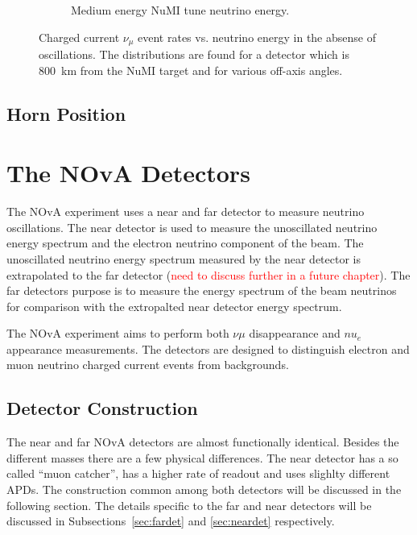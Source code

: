 \begin{figure}
\begin{subfigure}[b]{0.45\textwidth}
    \caption{Medium energy NuMI tune neutrino energy.}
    \label{fig:NuESpectra_MEAndLE_b}
  \end{subfigure}
  \caption{Charged current $\nu_{\mu}$ event rates vs. neutrino
    energy in the absense of oscillations. The distributions are found
  for a detector which is 800~km from the NuMI target and for various
  off-axis angles.}
  \label{fig:NuESpectra_MEAndLE}
\end{figure}




\subsection{Horn Position}


\section{The NOvA Detectors}

The NOvA experiment uses a near and far detector to measure neutrino
oscillations. The near detector is used to measure the unoscillated
neutrino energy spectrum and the electron neutrino component of the
beam. The unoscillated neutrino energy spectrum measured by the near
detector is extrapolated to the far detector (\textcolor{red}{need to
  discuss further in a future chapter}). The far detectors purpose is
to measure the energy spectrum of the beam neutrinos for comparison
with the extropalted near detector energy spectrum.

The NOvA experiment aims to perform both $\nu{\mu}$ disappearance and
$nu_e$ appearance measurements. The
detectors are designed to distinguish electron and muon neutrino
charged current events from backgrounds. 


\subsection{Detector Construction}

The near and far NOvA detectors are almost functionally
identical. Besides
the different masses there are a few physical
differences. The near detector has a so called ``muon catcher'', has a
higher rate of readout and uses slighlty different APDs. The
construction common among both detectors will be discussed in the
following section. The details specific to the far and near detectors
will be discussed in Subsections~\ref{sec:fardet} and
\ref{sec:neardet} respectively.

